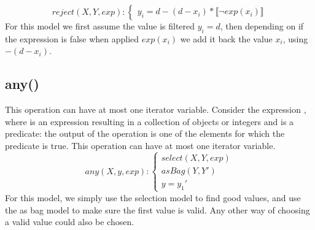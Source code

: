 \begin{equation}\label{csp:reject}
    reject(X,Y,exp):
    \begin{cases}
        y_i = d - (d-x_i)*\llbracket \neg exp(x_i) \rrbracket
    \end{cases}
\end{equation}
For this model we first assume the value is filtered $y_i=d$, then depending on if the expression is false when applied $exp(x_i)$ we add it back the value $x_i$, using $-(d-x_i)$.

\newpage
\subsection{any()}
This operation can have at most one iterator variable.
Consider the expression , where  is an expression resulting in a collection of objects or integers and  is a predicate: the output of the operation is one of the elements for which the predicate is true.
This operation can have at most one iterator variable.
\begin{equation}\label{csp:any}
    any(X,y,exp):
    \begin{cases}
        select(X,Y,exp)\\
        asBag(Y,Y')\\
        y = y_1'
    \end{cases}
\end{equation}
For this model, we simply use the selection model to find good values, and use the as bag model to make sure the first value is valid.
Any other way of choosing a valid value could also be chosen.

